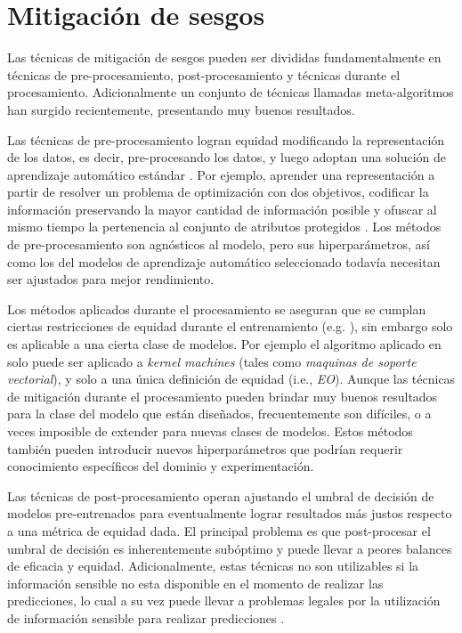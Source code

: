 \section{Mitigación de sesgos}\label{section:mitigation}


Las técnicas de mitigación de sesgos pueden ser divididas fundamentalmente en técnicas de pre-procesamiento, post-procesamiento y técnicas durante el procesamiento. Adicionalmente un conjunto de técnicas llamadas meta-algoritmos han surgido recientemente, presentando muy buenos resultados.

Las técnicas de pre-procesamiento logran equidad modificando la representación de los datos, es decir, pre-procesando los datos, y luego adoptan una solución de aprendizaje automático estándar \parencite{nips2017preproc, Kamiran2011DataPT, zemel2013learning}.
Por ejemplo, aprender una representación a partir de resolver un problema de optimización con dos objetivos, codificar la información preservando la mayor cantidad de información posible y ofuscar al mismo tiempo la pertenencia al conjunto de atributos protegidos \parencite{zemel2013learning}.
Los métodos de pre-procesamiento son agnósticos al modelo, pero sus hiperparámetros, así como los del modelos de aprendizaje automático seleccionado todavía necesitan ser ajustados para mejor rendimiento.

Los métodos aplicados durante el procesamiento se aseguran que se cumplan ciertas restricciones de equidad durante el entrenamiento (e.g. \parencite{donini2018empirical, zafar2017fairness, zafar2019fairness}), sin embargo solo es aplicable a una cierta clase de modelos.
Por ejemplo el algoritmo aplicado en \parencite{donini2018empirical} solo puede ser aplicado a \emph{kernel machines} (tales como \emph{maquinas de soporte vectorial}), y solo a una única definición de equidad (i.e., \emph{EO}).
Aunque las técnicas de mitigación durante el procesamiento pueden brindar muy buenos resultados para la clase del modelo que están diseñados, frecuentemente son difíciles, o a veces imposible de extender para nuevas clases de modelos.
Estos métodos también pueden introducir nuevos hiperparámetros que podrían requerir conocimiento específicos del dominio y experimentación.

Las técnicas de post-procesamiento operan ajustando el umbral de decisión de modelos pre-entrenados para eventualmente lograr resultados más justos respecto a una métrica de equidad dada.
El principal problema es que post-procesar el umbral de decisión es inherentemente subóptimo y puede llevar a peores balances de eficacia y equidad.
Adicionalmente, estas técnicas no son utilizables si la información sensible no esta disponible en el momento de realizar las predicciones, lo cual a su vez puede llevar a problemas legales por la utilización de información sensible para realizar predicciones \parencite{MacCarthy2018StandardsOF}.

